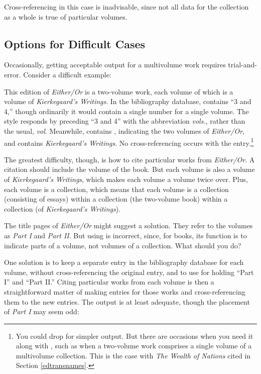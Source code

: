 \documentclass[11pt,letterpaper,oneside]{article}
\begin{document}
Cross-referencing in this case is inadvisable, since not all data for
the collection as a whole is true of particular volumes.

\subsection{Options for Difficult Cases}

Occasionally, getting acceptable output for a multivolume work
requires trial-and-error. Consider a difficult example:

\begin{citebib}
\item \cite{kierkegaard1987}
\end{citebib}

\noindent This edition of \textit{Either/Or} is a two-volume work,
each volume of which is a volume of \textit{Kierkegaard's Writings}.
In the bibliography database,  contains ``3 and 4,''
though ordinarily it would contain a single number for a single
volume. The style responds by preceding ``3 and 4'' with the
abbreviation \textit{vols.}, rather than the usual, \textit{vol}.
Meanwhile,  contains , indicating the
two volumes of \textit{Either/Or}, and  contains
\textit{Kierkegaard's Writings}. No cross-referencing occurs with the
entry.\footnote{You could drop  for simpler output.
But there are occasions when you need it along with
, such as when a two-volume work comprises a single
volume of a multivolume collection. This is the case with \textit{The
Wealth of Nations} cited in Section \ref{edtransnames}.}

The greatest difficulty, though, is how to cite particular works from
\textit{Either/Or}. A citation should include the volume of the book.
But each volume is also a volume of \textit{Kierkegaard's Writings},
which makes each volume a volume twice over. Plus, each volume is a
collection, which means that each volume is a collection (consisting
of essays) within a collection (the two-volume book) within a
collection (of \textit{Kierkegaard's Writings}).

The title pages of \textit{Either/Or} might suggest a solution. They
refer to the volumes as \textit{Part I} and \textit{Part II}. But
using  is incorrect, since, for books, its function is
to indicate parts of a volume, not volumes of a collection. What
should you do?

One solution is to keep a separate entry in the bibliography database
for each volume, without cross-referencing the original entry, and to
use  for holding ``Part I'' and ``Part II.'' Citing
particular works from each volume is then a straightforward matter of
making  entries for those works and
cross-referencing them to the new  entries. The
output is at least adequate, though the placement of \textit{Part I}
may seem odd:
\end{document}
